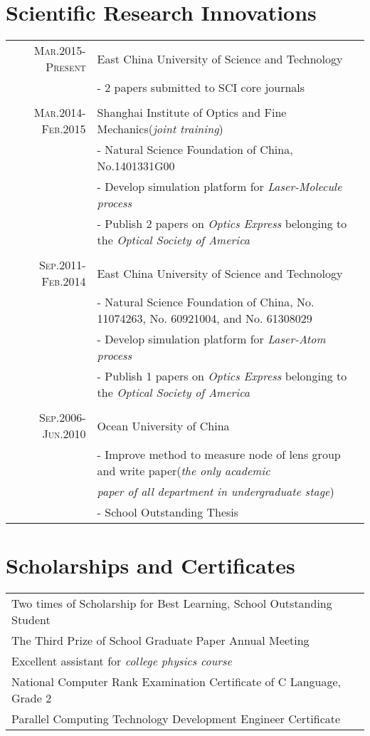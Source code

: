 \documentclass[a4paper,11pt]{article}
\begin{document}
{\section{Scientific Research Innovations}
\begin{tabular}{r|p{12cm}}
 \textsc{Mar.2015-Present}&East China University of Science and Technology  \\
 &\footnotesize{- 2 papers submitted to SCI core journals}\\\multicolumn{2}{c}{} \\
 \textsc{Mar.2014-Feb.2015}&Shanghai Institute of Optics and Fine Mechanics(\emph{joint training}) \\
 &\footnotesize{- Natural Science Foundation of China, No.1401331G00}\\
 &\footnotesize{- Develop simulation platform for \emph{Laser-Molecule process}}\\
 &\footnotesize{- Publish 2 papers on \emph{Optics Express} belonging to the \emph{Optical Society of America}}\\\multicolumn{2}{c}{} \\
 \textsc{Sep.2011-Feb.2014}&East China University of Science and Technology \\
 &\footnotesize{- Natural Science Foundation of China, No. 11074263, No. 60921004, and No. 61308029}\\
 &\footnotesize{- Develop simulation platform for \emph{Laser-Atom process}}\\
 &\footnotesize{- Publish 1 papers on \emph{Optics Express} belonging to the \emph{Optical Society of America}}\\\multicolumn{2}{c}{} \\
\textsc{Sep.2006-Jun.2010}&Ocean University of China\\
 &\footnotesize{- Improve method to measure node of lens group and write paper(\emph{the only academic}}\\
 &\footnotesize{\hspace{3pt} \emph{paper of all department in undergraduate stage})}\\
 &\footnotesize{- School Outstanding Thesis} 
\end{tabular}
\section{Scholarships and Certificates}
\begin{tabular}{p{15cm}}
Two times of Scholarship for Best Learning, School Outstanding Student\\
The Third Prize of School Graduate Paper Annual Meeting\\
Excellent assistant for \emph{college physics course}\\
National Computer Rank Examination Certificate of C Language, Grade 2\\
Parallel Computing Technology Development Engineer Certificate
\end{tabular}
}
\end{document}
